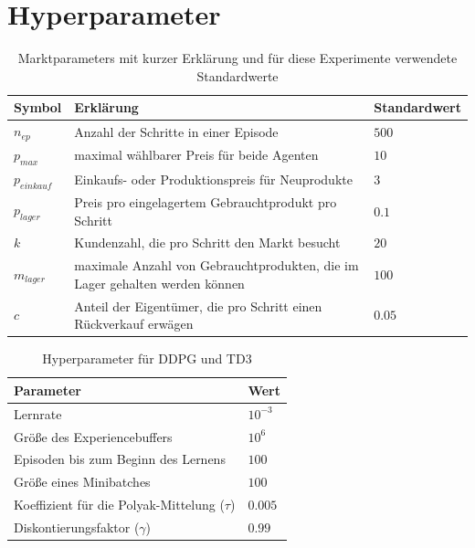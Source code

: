 \section{Hyperparameter}
\label{section:hyperparameter}
\begin{table}[t]
	\centering
	\begin{tabular}{l p{} l}
		\toprule
		Symbol        & Erklärung                                                                   & Standardwert\\\midrule
		$n_{ep}$      & Anzahl der Schritte in einer Episode                                        & $500$\\
		$p_{max}$     & maximal wählbarer Preis für beide Agenten                                   & $10$\\
		$p_{einkauf}$ & Einkaufs- oder Produktionspreis für Neuprodukte                             & $3$\\
		$p_{lager}$   & Preis pro eingelagertem Gebrauchtprodukt pro Schritt                        & $0.1$\\
		$k$           & Kundenzahl, die pro Schritt den Markt besucht                               & $20$\\
		$m_{lager}$   & maximale Anzahl von Gebrauchtprodukten, die im Lager gehalten werden können & $100$\\
		$c$           & Anteil der Eigentümer, die pro Schritt einen Rückverkauf erwägen            & $0.05$\\\bottomrule
	\end{tabular}
	\caption{Marktparameters mit kurzer Erklärung und für diese Experimente verwendete Standardwerte}
	\label{tab:default_parameters}
\end{table}

\begin{table}[t]
	\centering
	\begin{tabular}{p{} l}
		\toprule
		Parameter                                     & Wert\\\midrule
		Lernrate                                      & $10^{-3}$\\
		Größe des Experiencebuffers                   & $10^6$\\
		Episoden bis zum Beginn des Lernens           & $100$\\
		Größe eines Minibatches                       & $100$\\
		Koeffizient für die Polyak-Mittelung ($\tau$) & $0.005$\\
		Diskontierungsfaktor ($\gamma$)               & $0.99$\\\bottomrule
	\end{tabular}
	\caption{Hyperparameter für DDPG und TD3}
	\label{tab:DDPGHyperparameters}
\end{table}

